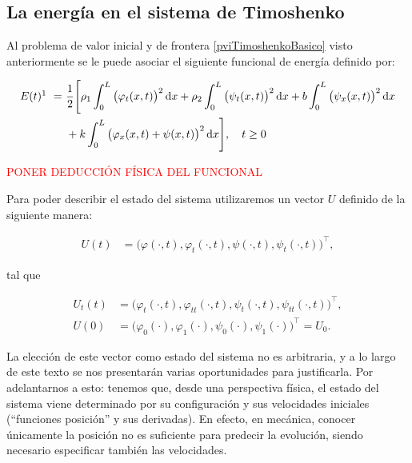 \subsection{La energía en el sistema de Timoshenko}
\label{ch:teoriaVigas:section:primerosmodelos:subsection:timoshenkoEnergia}

Al problema de valor inicial y de frontera \eqref{pviTimoshenkoBasico} visto anteriormente se le puede asociar el siguiente funcional de energía definido por:

\begin{equation}
    \label{timoshenkoBasico:funcionalEnergia}
    \begin{aligned}
        E(t)\footnotemark \ = \  &\frac{1}{2} \Bigg[ \rho_1 \int_0^L \big(\varphi_t(x,t) \big)^2 \, \dd x + \rho_2 \int_0^L \big(\psi_t(x,t) \big)^2 \, \dd x + b\int_0^L \big(\psi_x(x,t) \big)^2 \, \dd x\\
        &+ k\int_0^L \big(\varphi_x(x,t) + \psi(x,t) \big)^2 \, \dd x \Bigg], \quad t \geq 0
    \end{aligned}
\end{equation}


\textcolor{red}{PONER DEDUCCIÓN FÍSICA DEL FUNCIONAL}

Para poder describir el estado del sistema utilizaremos un vector $U$ definido de la siguiente manera:

\begin{align}
    U(t) &= \Big(\varphi(\cdot, t), \varphi_t(\cdot, t), \psi(\cdot, t), \psi_t(\cdot, t)\Big)^\top,
    \label{vectorEstadoTimoBasico}
\end{align}

tal que

\begin{align*}
    U_t(t) &= \Big(\varphi_t(\cdot, t), \varphi_{tt}(\cdot, t), \psi_t(\cdot, t), \psi_{tt}(\cdot, t)\Big)^\top,\\
    U(0) &= \Big(\varphi_0(\cdot), \varphi_1(\cdot), \psi_0(\cdot), \psi_1(\cdot)\Big)^\top = U_0.
\end{align*}

La elección de este vector como estado del sistema no es arbitraria, y a lo largo de este texto se nos presentarán varias oportunidades para justificarla. Por adelantarnos a esto: tenemos que, desde una perspectiva física, el estado del sistema viene determinado por su configuración y sus velocidades iniciales (``funciones posición'' y sus derivadas). En efecto, en mecánica, conocer únicamente la posición no es suficiente para predecir la evolución, siendo necesario especificar también las velocidades.

